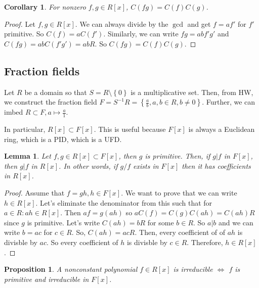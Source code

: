 \documentclass{article}
\newtheorem{corollary}{Corollary}[theorem]
\newtheorem{lemma}[theorem]{Lemma}
\theoremstyle{definition}
\theoremstyle{remark}
\theoremstyle{plain}
\newtheorem{prop}{Proposition}[subsection]
\begin{document}
\begin{corollary}
    For nonzero \(f,g \in R[x]\), \(C(fg) = C(f)C(g)\).
\end{corollary}

\begin{proof}
    Let \(f,g \in R[x]\). We can always divide by the \(\gcd\) and get \(f = af'\)
    for \(f'\) primitive. So \(C(f) = aC(f')\). Similarly, we can write \(fg = abf'g'\) and \(C(fg) = abC(f'g') = abR\).
    So \(C(fg) = C(f)C(g)\).
\end{proof}

\subsection{Fraction fields}

Let \(R\) be a domain so that \(S = R \setminus \left\{ 0 \right\}\) is a multiplicative set.
Then, from HW, we construct the fraction field \(F = S^{-1}R = \left\{ \frac{a}{b}, a,b \in R, b \neq 0 \right\}\). 
Further, we can imbed \(R \subset F, a \mapsto \frac{a}{1} \).

In particular, \(R[x]\subset F[x]\). This is useful because \(F[x]\) is always a Euclidean
ring, which is a PID, which is a UFD.

\begin{lemma}
    Let \(f,g \in R[x] \subset F[x]\), then \(g\) is primitive. Then, if \(g|f\) in \(F[x]\),
    then \(g|f\) in \(R[x]\). In other words, if \(g/f\) exists in \(F[x]\) then it has coefficients in
    \(R[x]\).
\end{lemma}
\begin{proof}
    Assume that \(f = gh, h \in F[x]\). We want to prove that we can write \(h \in R[x]\).
    Let's eliminate the denominator from this such that for \(a \in R: ah \in R[x]\). Then
    \(af = g(ah)\) so \(aC(f) = C(g)C(ah) = C(ah)R\) since \(g\) is primitive. Let's write \(C(ah) = bR\) for some
    \(b \in R\). So \(a|b\) and we can write \(b = ac\) for \(c \in R\). So, \(C(ah) = acR\). Then, every coefficient of  of \(ah\)
    is divisble by \(ac\). So every coefficient of \(h\) is divisble by \(c \in R\). Therefore, \(h \in R[x]\).
\end{proof}

\begin{prop}
    A nonconstant polynomial \(f \in R[x]\) is irreducible \(\iff\) \(f\) is primitive and irreducible in \(F[x]\).
\end{prop}
\end{document}
